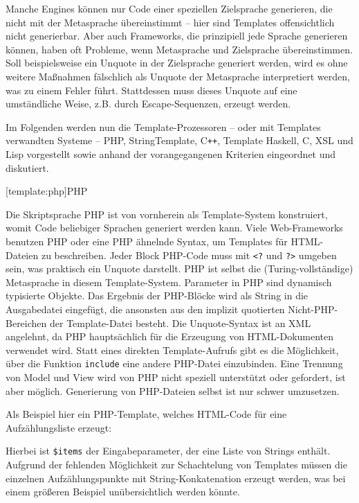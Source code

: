 \documentclass[12pt, a4paper, bibgerm]{scrbook}
\newenvironment{DIFnomarkup}{}{}
\newcommand\icode[1]{\lstinline?#1?}
\newcommand\phpo{\lstinline+<?+}
\newcommand\phpc{\lstinline+?>+}
\newcommand\lsection{}
\newcommand{\cpp}{C\texttt{++}}
\begin{document}
Manche Engines können nur Code einer speziellen Zielsprache generieren,
die nicht mit der Metasprache übereinstimmt -- hier sind Templates
offensichtlich nicht generierbar. Aber auch Frameworks, die prinzipiell
jede Sprache generieren können, haben oft Probleme, wenn Metasprache und
Zielsprache übereinstimmen. Soll beispielsweise ein Unquote in der
Zielsprache generiert werden, wird es ohne weitere Maßnahmen fälschlich
als Unquote der Metasprache interpretiert werden, was zu einem Fehler
führt. Stattdessen muss dieses Unquote auf eine umständliche Weise,
z.B. durch Escape-Sequenzen, erzeugt werden.

\medskip{}

Im Folgenden werden nun die Template-Prozessoren -- oder mit Templates
verwandten Systeme -- PHP, StringTemplate, \cpp{}, Template Haskell, C, XSL
und Lisp vorgestellt sowie anhand der vorangegangenen Kriterien
eingeordnet und diskutiert.

\lsection[template:php]{PHP}

Die Skriptsprache PHP ist von vornherein als Template-System
konstruiert, womit Code beliebiger Sprachen generiert werden kann. Viele
Web-Frameworks benutzen PHP oder eine PHP ähnelnde Syntax, um Templates
für HTML-Dateien zu beschreiben. Jeder Block PHP-Code muss mit \phpo{}
und \phpc{} umgeben sein, was praktisch ein Unquote darstellt. PHP ist
selbst die (Turing-vollständige) Metasprache in diesem
Template-System. Parameter in PHP sind dynamisch typisierte Objekte. Das
Ergebnis der PHP-Blöcke wird als String in die Ausgabedatei eingefügt,
die ansonsten aus den implizit quotierten Nicht-PHP-Bereichen der
Template-Datei besteht. Die Unquote-Syntax ist an XML angelehnt, da PHP
hauptsächlich für die Erzeugung von HTML-Dokumenten verwendet
wird. Statt eines direkten Template-Aufrufs gibt es die Möglichkeit,
über die Funktion \icode{include} eine andere PHP-Datei
einzubinden. Eine Trennung von Model und View wird von PHP nicht
speziell unterstützt oder gefordert, ist aber möglich. Generierung von
PHP-Dateien selbst ist nur schwer umzusetzen.

Als Beispiel hier ein PHP-Template, welches HTML-Code für eine
Aufzählungsliste erzeugt:
\begin{DIFnomarkup}\end{DIFnomarkup} %
Hierbei ist \icode{$items} %
 der Eingabeparameter, der eine Liste von
Strings enthält.  Aufgrund der fehlenden Möglichkeit zur Schachtelung
von Templates müssen die einzelnen Aufzählungspunkte mit
String-Konkatenation erzeugt werden, was bei einem größeren Beispiel
unübersichtlich werden könnte.
\end{document}
